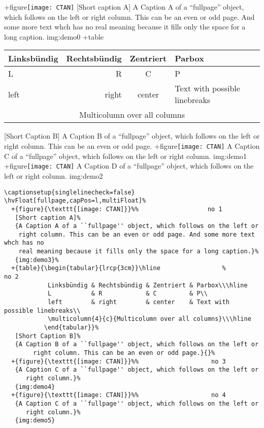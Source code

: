 \documentclass{scrartcl}
\begin{document}
\Float[Multi]
\captionsetup{singlelinecheck=false}
\hvFloat[fullpage,capPos=l,multiFloat]%
  +{figure}{\texttt{[image: CTAN]}}%
   [Short caption A]%
   {A Caption A of a ``fullpage'' object, which follows on the left or
    right column. This can be an even or odd page. And some more text whch has no
    real meaning because it fills only the space for a long caption.}%
   {img:demo0}%
  +{table}{\begin{tabular}{lrcp{3cm}}\hline                 %
            Linksbündig & Rechtsbündig & Zentriert & Parbox\\\hline
            L           & R            & C         & P\\
            left        & right        & center    & Text with possible linebreaks\\
            \multicolumn{4}{c}{Multicolumn over all columns}\\\hline
           \end{tabular}}%
   [Short Caption B]%
   {A Caption B of a ``fullpage'' object, which follows on the left or
        right column. This can be an even or odd page.}{}%
  +{figure}{\texttt{[image: CTAN]}}%
   {A Caption C of a ``fullpage'' object, which follows on the left or
      right column.}%
   {img:demo1}
  +{figure}{\texttt{[image: CTAN]}}%
   {A Caption D of a ``fullpage'' object, which follows on the left or
      right column.}%
   {img:demo2}



\blinddocument


\begin{lstlisting}
\captionsetup{singlelinecheck=false}
\hvFloat[fullpage,capPos=l,multiFloat]%
  +{figure}{\texttt{[image: CTAN]}}%%                   no 1
   [Short caption A]%
   {A Caption A of a ``fullpage'' object, which follows on the left or
    right column. This can be an even or odd page. And some more text whch has no
    real meaning because it fills only the space for a long caption.}%
   {img:demo3}%
  +{table}{\begin{tabular}{lrcp{3cm}}\hline                 %             no 2
            Linksbündig & Rechtsbündig & Zentriert & Parbox\\\hline
            L           & R            & C         & P\\
            left        & right        & center    & Text with possible linebreaks\\
            \multicolumn{4}{c}{Multicolumn over all columns}\\\hline
           \end{tabular}}%
   [Short Caption B]%
   {A Caption B of a ``fullpage'' object, which follows on the left or
        right column. This can be an even or odd page.}{}%
  +{figure}{\texttt{[image: CTAN]}}%%                    no 3
   {A Caption C of a ``fullpage'' object, which follows on the left or
      right column.}%
   {img:demo4}
  +{figure}{\texttt{[image: CTAN]}}%%                    no 4
   {A Caption C of a ``fullpage'' object, which follows on the left or
      right column.}%
   {img:demo5}
\end{lstlisting}
\end{document}

